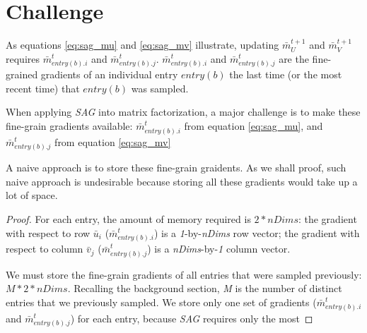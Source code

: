 \section{Challenge}
As equations \ref{eq:sag_mu} and \ref{eq:sag_mv} illustrate, updating $\bar{m}_{U}^{t+1}$ and $\bar{m}_{V}^{t+1}$ requires $\bar{m}_{entry(b).i}^{t}$ and $\bar{m}_{entry(b).j}^{t}$.  
$\bar{m}_{entry(b).i}^{t}$ and $\bar{m}_{entry(b).j}^{t}$ are the fine-grained gradients of an individual entry $entry(b)$ the last time (or the most recent time) that $entry(b)$ was sampled.  

When applying \emph{SAG} into matrix factorization, a major challenge is to make these fine-grain gradients available: 
$\bar{m}_{entry(b).i}^{t}$ from equation \ref{eq:sag_mu}, and 
$\bar{m}_{entry(b).j}^{t}$ from equation \ref{eq:sag_mv}  

A naive approach is to store these fine-grain graidents.  
As we shall proof, such naive approach is undesirable because storing all these gradients would take up a lot of space.  

\newtheorem{totalspace}{The total asymptotic space complexity of is }  
\begin{proof}[Proof]  
For each entry, the amount of memory required is $2*nDims$:  
the gradient with respect to row $\bar{u}_i$ ($\bar{m}_{entry(b).i}^{t}$) is a \emph{1}-by-\emph{nDims} row vector;  
the gradient with respect to column $\bar{v}_j$ ($\bar{m}_{entry(b).j}^{t}$) is a \emph{nDims}-by-\emph{1} column vector.  

We must store the fine-grain gradients of all entries that were sampled previously: $M*2*nDims$.  
Recalling the background section, \emph{M} is the number of distinct entries that we previously sampled.  
We store only one set of gradients ($\bar{m}_{entry(b).i}^{t}$ and $\bar{m}_{entry(b).j}^{t}$) for each entry, 
because \emph{SAG} requires only the most 
\end{proof}

